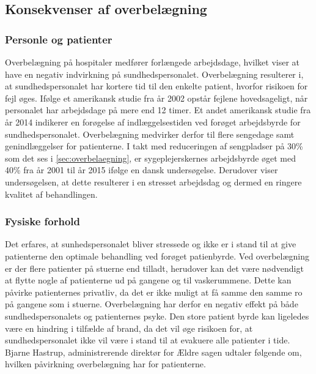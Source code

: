 \subsection{Konsekvenser af overbelægning}


\subsubsection{Personle og patienter}
Overbelægning på hospitaler medfører forlængede arbejdsdage, hvilket viser at have en negativ indvirkning på sundhedspersonalet.\cite{Kjeldsen2015} \cite{Dinges2004} Overbelægning resulterer i, at sundhedspersonalet har kortere tid til den enkelte patient, hvorfor risikoen for fejl øges. Ifølge et amerikansk studie fra år 2002 opstår fejlene hovedsageligt, når personalet har arbejdsdage på mere end 12 timer.\cite{Dinges2004} Et andet amerikansk studie fra år 2014 indikerer en forøgelse af indlæggelsestiden ved forøget arbejdsbyrde for sundhedspersonalet\cite{Elliott2014}. Overbelægning medvirker derfor til flere sengedage samt genindlæggelser for patienterne. I takt med reduceringen af sengpladser på 30\% som det ses i \autoref{sec:overbelaegning}, er sygeplejerskernes arbejdsbyrde øget med 40\% fra år 2001 til år 2015 ifølge en dansk undersøgelse. Derudover viser undersøgelsen, at dette resulterer i en stresset arbejdsdag og dermed en ringere kvalitet af behandlingen.\cite{Kjeldsen2015}  

\subsubsection{Fysiske forhold}

Det erfares, at sunhedspersonalet bliver stressede og ikke er i stand til at give patienterne den optimale behandling ved forøget patienbyrde. \cite{Aiken2002} Ved overbelægning er der flere patienter på stuerne end tilladt, herudover kan det være nødvendigt at flytte nogle af patienterne ud på gangene og til vaskerummene. Dette kan påvirke patienternes privatliv, da det er ikke muligt at få samme den samme ro på gangene som i stuerne. Overbelægning har derfor en negativ effekt på både sundhedspersonalets og patienternes psyke. Den store patient byrde kan ligeledes være en hindring i tilfælde af brand, da det vil øge risikoen for, at sundhedspersonalet ikke vil være i stand til at evakuere alle patienter i tide. \cite{Madsen2014} Bjarne Hastrup, administrerende direktør for Ældre sagen udtaler følgende om, hvilken påvirkning overbelægning har for patienterne. 

